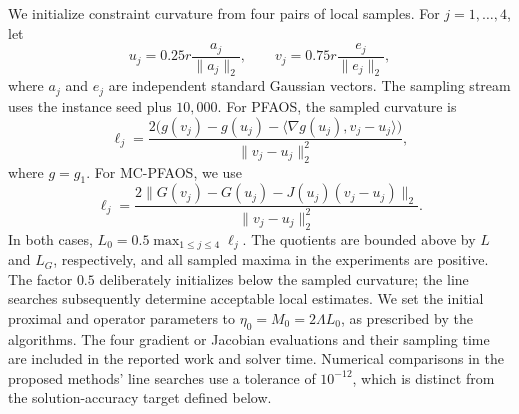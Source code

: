We initialize constraint curvature from four pairs of local samples. For
$j=1,\ldots,4$, let
\[
u_j=0.25r\frac{a_j}{\|a_j\|_2},\qquad
v_j=0.75r\frac{e_j}{\|e_j\|_2},
\]
where $a_j$ and $e_j$ are independent standard Gaussian vectors. The
sampling stream uses the instance seed plus $10{,}000$. For PFAOS, the
sampled curvature is
\begin{equation}\label{eq:numerical_scalar_curvature}
\ell_j=
\frac{2\bigl(g(v_j)-g(u_j)
-\langle\nabla g(u_j),v_j-u_j\rangle\bigr)}
{\|v_j-u_j\|_2^2},
\end{equation}
where $g=g_1$. For MC-PFAOS, we use
\begin{equation}\label{eq:numerical_vector_curvature}
\ell_j=
\frac{2\|G(v_j)-G(u_j)-J(u_j)(v_j-u_j)\|_2}
{\|v_j-u_j\|_2^2}.
\end{equation}
In both cases, $L_0=0.5\max_{1\le j\le4}\ell_j$. The quotients are
bounded above by $L$ and $L_G$, respectively, and all sampled maxima in
the experiments are positive. The factor $0.5$ deliberately initializes
below the sampled curvature; the line searches subsequently determine
acceptable local estimates. We set the initial proximal and operator
parameters to $\eta_0=M_0=2\Lambda L_0$, as prescribed by the algorithms.
The four gradient or Jacobian evaluations and their sampling time are
included in the reported work and solver time. Numerical comparisons in
the proposed methods' line searches use a tolerance of $10^{-12}$, which
is distinct from the solution-accuracy target defined below.


